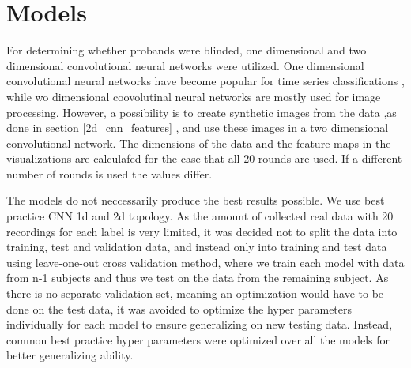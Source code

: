 \section{Models}
\label{models}
For determining whether probands were blinded, one dimensional and two dimensional convolutional neural networks were utilized. One dimensional convolutional neural networks have become popular for time series classifications , while wo dimensional coovolutinal neural networks are mostly used for image processing. However, a possibility is to create synthetic images from the data ,as done in section \ref{2d_cnn_features} , and use these images in a two dimensional convolutional network. The dimensions of the data and the feature maps in the visualizations are calculafed for the case that all 20 rounds are used. If a different number of rounds is used the values differ. 

The models do not neccessarily produce the best results possible. We use best practice CNN 1d  and 2d  topology. As the amount of collected real data with 20 recordings for each label is very limited, it was decided not to split the data into training, test and validation data, and instead only into training and test data using leave-one-out cross validation method, where we train each model with data from n-1 subjects and thus we test on the data from the remaining subject. As there is no separate validation set, meaning an optimization would have to be done on the test data, it was avoided to optimize the hyper parameters individually for each model to ensure generalizing on new testing data. Instead, common best practice hyper parameters were optimized over all the models for better generalizing ability.




